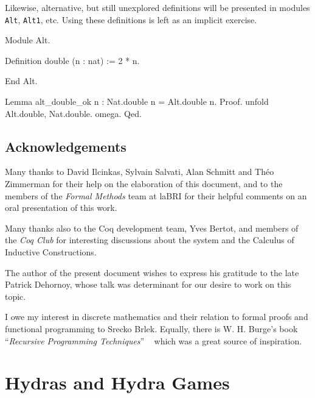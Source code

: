 \documentclass[a4paper]{book}
\begin{document}
Likewise, alternative, but still unexplored definitions will be presented in modules
\texttt{Alt}, \texttt{Alt1}, etc. Using these definitions is left as an implicit exercise.


\begin{Coqalt}
Module Alt.

  Definition double (n : nat) := 2 * n.

End Alt.
\end{Coqalt}

\begin{Coqsrc}
Lemma alt_double_ok n : Nat.double n = Alt.double n.
Proof.
  unfold Alt.double, Nat.double.
  omega.
Qed.
\end{Coqsrc}

\section{Acknowledgements}
\label{sec:orgheadline5}
    Many thanks to David Ilcinkas, Sylvain Salvati, Alan Schmitt and Théo Zimmerman for their help on the elaboration of this document, and to the
 members of the \emph{Formal Methods} team at laBRI for their helpful comments 
on an oral presentation of this work. 

Many thanks also to the Coq development team, Yves Bertot, and members of the \emph{Coq Club} for interesting discussions about the \coq{} system and the Calculus of Inductive Constructions.

The author of the present document wishes to express his gratitude to the late Patrick Dehornoy, whose talk  was determinant for our desire to work on this topic.

I owe my interest in discrete mathematics and their relation to formal proofs and functional programming  to Srecko Brlek.  Equally, there is W. H. Burge's book ``\emph{Recursive Programming Techniques}'' ~\cite{burge} which was a great  source of inspiration.












\chapter{Hydras and Hydra Games}
\label{sec:orgheadline91}
\end{document}
